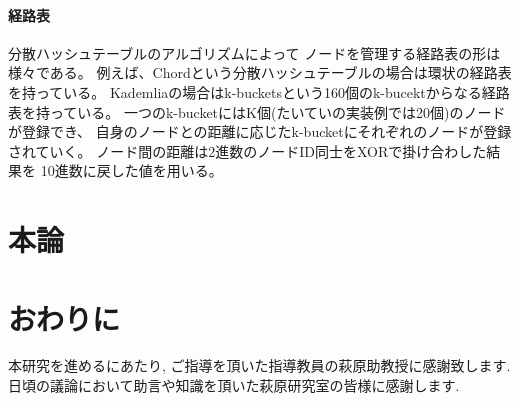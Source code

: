 \documentclass[sotsuron]{jcsie}
\begin{document}
\subsubsection{経路表}
分散ハッシュテーブルのアルゴリズムによって
ノードを管理する経路表の形は様々である。
例えば、Chordという分散ハッシュテーブルの場合は環状の経路表を持っている。
Kademliaの場合はk-bucketsという160個のk-bucektからなる経路表を持っている。
一つのk-bucketにはK個(たいていの実装例では20個)のノードが登録でき、
自身のノードとの距離に応じたk-bucketにそれぞれのノードが登録されていく。
ノード間の距離は2進数のノードID同士をXORで掛け合わした結果を
10進数に戻した値を用いる。

\chapter{本論}
\chapter{おわりに}
\begin{acknowledgment}
本研究を進めるにあたり, ご指導を頂いた指導教員の萩原助教授に感謝致します.
日頃の議論において助言や知識を頂いた萩原研究室の皆様に感謝します.
\end{acknowledgment}
\nocite{*}


\end{document}
